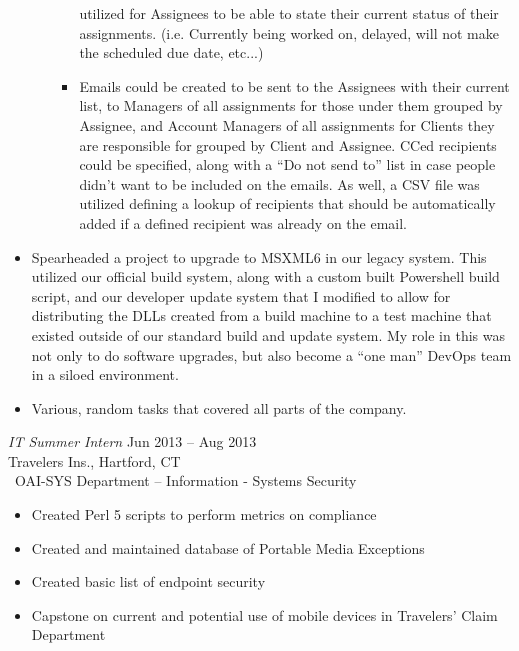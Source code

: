 \documentclass[margin]{res}
\begin{document}
\begin{resume}
\begin{itemize}
\begin{itemize}
\begin{itemize}
                     utilized for Assignees to be able to state their current status of their assignments.
                     (i.e. Currently being worked on, delayed, will not make the scheduled due date, 
                     etc...)
                  \item Emails could be created to be sent to the Assignees with their current list, to
                     Managers of all assignments for those under them grouped by Assignee, and Account
                     Managers of all assignments for Clients they are responsible for grouped by Client 
                     and Assignee. CCed recipients could be specified, along with a ``Do not send to'' 
                     list in case people didn't want to be included on the emails. As well, a CSV file 
                     was utilized defining a lookup of recipients that should be automatically added if
                     a defined recipient was already on the email.
               \end{itemize}
         \end{itemize}
      \item Spearheaded a project to upgrade to MSXML6 in our legacy system. This utilized our official
         build system, along with a custom built Powershell build script, and our developer update system
         that I modified to allow for distributing the DLLs created from a build machine to a test machine
         that existed outside
         of our standard build and update system. My role in this was not only to do software upgrades, 
         but also become a ``one man'' DevOps team in a siloed environment.
      \item Various, random tasks that covered all parts of the company.
   \end{itemize}

   {\sl IT Summer Intern} \hfill Jun 2013 -- Aug 2013 \\
   Travelers Ins., Hartford, CT\\\
   OAI-SYS Department -- Information - Systems Security
   \begin{itemize}  %
      \item Created Perl 5 scripts to perform metrics on
         compliance
      \item Created and maintained database of Portable
         Media Exceptions
      \item Created basic list of endpoint security
      \item Capstone on current and potential use of mobile
         devices in Travelers' Claim Department
   \end{itemize}


\end{resume}
\end{document}
